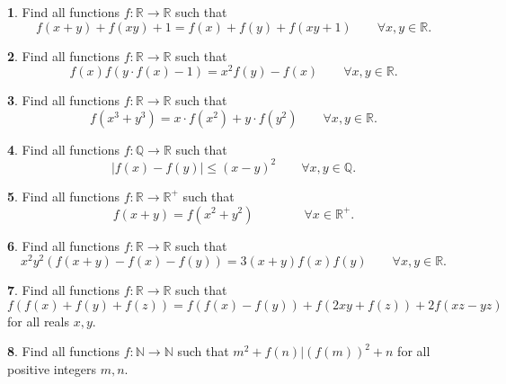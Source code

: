 \documentclass{article}
\newcommand{\plus}{+}
\newcommand{\minus}{-}
\newcommand{\equal}{=}
\theoremstyle{definition}
\newtheorem{p}{}
\begin{document}
\begin{p}
Find all functions $ f: \mathbb R \to \mathbb R$ such that
\[f(x + y) + f(xy) + 1 = f(x) + f(y) + f(xy + 1) \qquad \forall x,y \in \mathbb R.\]
\end{p}



\begin{p}
Find all functions $ f: \mathbb R \to \mathbb R$ such that
\[f(x)f(y\cdot f(x)-1)=x^2f(y)-f(x) \qquad \forall x,y \in \mathbb R.\]
\end{p}



\begin{p}
Find all functions $ f: \mathbb R \to \mathbb R$ such that
\[f(x^3+y^3)=x \cdot f(x^2)+y\cdot f(y^2) \qquad \forall x,y \in \mathbb R.\]
\end{p}





\begin{p}
Find all functions $ f: \mathbb Q \to \mathbb R$ such that
\[ |f(x)\minus{}f(y)|\leq(x\minus{}y)^2 \qquad \forall x,y \in \mathbb Q.\]
\end{p}



\begin{p}
Find all functions $ f: \mathbb R \to \mathbb R^+$ such that
\[f(x+y)=f(x^2+y^2) \qquad \qquad \forall x \in \mathbb R^+.\]
\end{p}



\begin{p}
Find all functions $ f : \mathbb R\to \mathbb R$ such that
\[ x^2y^2 \left( f(x+y)-f(x)-f(y) \right)=3(x+y)f(x)f(y) \qquad \forall x,y \in \mathbb R.\]
\end{p}




\begin{p}
Find all functions $ f: \mathbb R \to \mathbb R$ such that
\[f(f(x) \plus{} f(y) \plus{} f(z)) \equal{} f(f(x) \minus{} f(y)) \plus{} f(2xy \plus{} f(z)) \plus{} 2f(xz \minus{} yz)\]
for all reals $x,y$.
\end{p}



\begin{p}
Find all functions $ f: \mathbb N\to \mathbb N$ such that $m^2\plus{}f(n)|(f(m))^2\plus{}n$ for all positive integers $m,n$.
\end{p}
\end{document}
